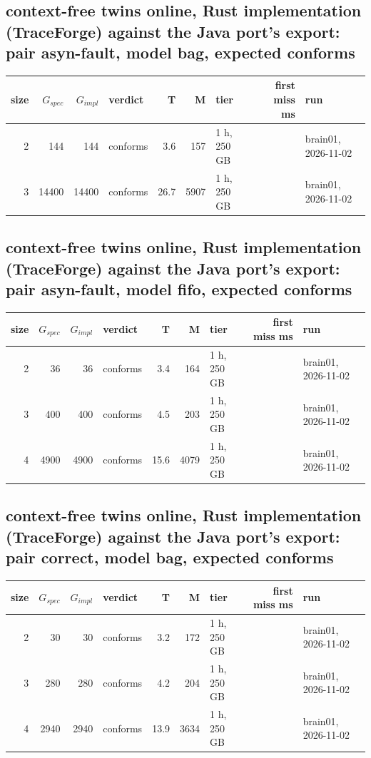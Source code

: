\documentclass[10pt]{article}
\begin{document}
\subsection*{context-free twins online, Rust implementation (TraceForge) against the Java port's export: pair \textsf{asyn-fault}, model bag, expected conforms}
\begin{longtable}{@{}rrrlrrlrl@{}}
\toprule
size & $G_{\mathit{spec}}$ & $G_{\mathit{impl}}$ & verdict & T & M & tier & first miss ms & run \\
\midrule
\endhead
\color{red} 2 & 144 & 144 & conforms & 3.6 & 157 & 1 h, 250 GB &  & brain01, 2026-11-02 \\
\color{red} 3 & 14400 & 14400 & conforms & 26.7 & 5907 & 1 h, 250 GB &  & brain01, 2026-11-02 \\
\bottomrule
\end{longtable}
\subsection*{context-free twins online, Rust implementation (TraceForge) against the Java port's export: pair \textsf{asyn-fault}, model fifo, expected conforms}
\begin{longtable}{@{}rrrlrrlrl@{}}
\toprule
size & $G_{\mathit{spec}}$ & $G_{\mathit{impl}}$ & verdict & T & M & tier & first miss ms & run \\
\midrule
\endhead
\color{red} 2 & 36 & 36 & conforms & 3.4 & 164 & 1 h, 250 GB &  & brain01, 2026-11-02 \\
\color{red} 3 & 400 & 400 & conforms & 4.5 & 203 & 1 h, 250 GB &  & brain01, 2026-11-02 \\
\color{red} 4 & 4900 & 4900 & conforms & 15.6 & 4079 & 1 h, 250 GB &  & brain01, 2026-11-02 \\
\bottomrule
\end{longtable}
\subsection*{context-free twins online, Rust implementation (TraceForge) against the Java port's export: pair \textsf{correct}, model bag, expected conforms}
\begin{longtable}{@{}rrrlrrlrl@{}}
\toprule
size & $G_{\mathit{spec}}$ & $G_{\mathit{impl}}$ & verdict & T & M & tier & first miss ms & run \\
\midrule
\endhead
\color{red} 2 & 30 & 30 & conforms & 3.2 & 172 & 1 h, 250 GB &  & brain01, 2026-11-02 \\
\color{red} 3 & 280 & 280 & conforms & 4.2 & 204 & 1 h, 250 GB &  & brain01, 2026-11-02 \\
\color{red} 4 & 2940 & 2940 & conforms & 13.9 & 3634 & 1 h, 250 GB &  & brain01, 2026-11-02 \\
\bottomrule
\end{longtable}
\end{document}
